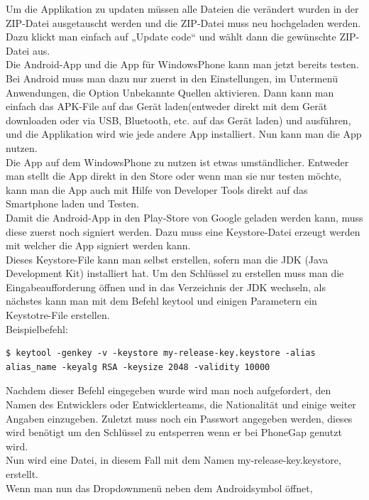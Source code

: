 Um die Applikation zu updaten müssen alle Dateien die verändert wurden in der ZIP-Datei ausgetauscht werden und die ZIP-Datei muss neu hochgeladen werden. Dazu klickt man einfach auf „Update code“ und wählt dann die gewünschte ZIP-Datei aus.\\
Die Android-App und die App für WindowsPhone kann man jetzt bereits testen. Bei Android muss man dazu nur zuerst in den Einstellungen, im Untermenü Anwendungen, die Option Unbekannte Quellen aktivieren. Dann kann man einfach das APK-File auf das Gerät laden(entweder direkt mit dem Gerät downloaden oder via USB, Bluetooth, etc. auf das Gerät laden) und ausführen, und die Applikation wird wie jede andere App installiert. Nun kann man die App nutzen.\\
Die App auf dem WindowsPhone zu nutzen ist etwas umständlicher. Entweder man stellt die App direkt in den Store oder wenn man sie nur testen möchte, kann man die App auch mit Hilfe von Developer Tools direkt auf das Smartphone laden und Testen.\\
Damit die Android-App in den Play-Store von Google geladen werden kann, muss diese zuerst noch signiert werden. Dazu muss eine Keystore-Datei erzeugt werden mit welcher die App signiert werden kann.\\
Dieses Keystore-File kann man selbst erstellen, sofern man die JDK (Java Development Kit) installiert hat. Um den Schlüssel zu erstellen muss man die Eingabeaufforderung öffnen und in das Verzeichnis der JDK wechseln, als nächstes kann man mit dem Befehl keytool und einigen Parametern ein Keystotre-File erstellen.\\
Beispielbefehl:\\

\begin{lstlisting}
$ keytool -genkey -v -keystore my-release-key.keystore -alias alias_name -keyalg RSA -keysize 2048 -validity 10000
\end{lstlisting}

Nachdem dieser Befehl eingegeben wurde wird man noch aufgefordert, den Namen des Entwicklers oder Entwicklerteams, die Nationalität und einige weiter Angaben einzugeben. Zuletzt muss noch ein Passwort angegeben werden, dieses wird benötigt um den Schlüssel zu entsperren wenn er bei PhoneGap genutzt wird.\\
Nun wird eine Datei, in diesem Fall mit dem Namen my-release-key.keystore, erstellt.\\
Wenn man nun das Dropdownmenü neben dem Androidsymbol öffnet,\\

